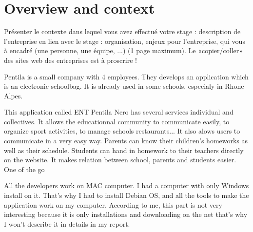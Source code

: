 
\section{Overview and context}

Présenter le contexte dans lequel vous avez effectué votre stage : description de l’entreprise en lien avec le stage : organisation, enjeux pour l’entreprise, qui vous à encadré (une personne, une équipe, ...) (1 page maximum). Le «copier/coller» des sites web des entreprises est à proscrire !
\newline

Pentila is a small company with 4 employees. They develops an application which is an electronic schoolbag. 
It is already used in some schools, especialy in Rhone Alpes. 

This application called ENT Pentila Nero has several services individual and collectives. 
It allows the educationnal community to communicate easily, to organize sport 
activities, to manage schools restaurants... 
It also alows users to communicate in a very easy way. Parents can know their 
children's homeworks as well as their schedule. Students can hand in homework to their 
teachers directly on the website. It makes relation between school, parents and students easier. 
One of the go

All the developers work on MAC computer. I had a computer with only Windows install on it. 
	That's why I had to install Debian OS, and all the tools to make the application 
	work on my computer. According to me, this part is not very interesting because it
	is only installations and downloading on the net that's why I won't describe it in details in my report. 





